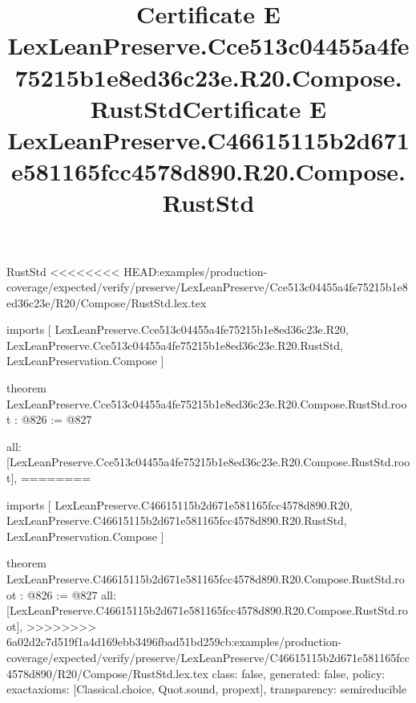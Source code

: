 \begin{lexlean}{RustStd}
<<<<<<<< HEAD:examples/production-coverage/expected/verify/preserve/LexLeanPreserve/Cce513c04455a4fe75215b1e8ed36c23e/R20/Compose/RustStd.lex.tex
\title{Certificate E LexLeanPreserve.Cce513c04455a4fe75215b1e8ed36c23e.R20.Compose.RustStd}
\begin{coremodule}
imports [
  LexLeanPreserve.Cce513c04455a4fe75215b1e8ed36c23e.R20,
  LexLeanPreserve.Cce513c04455a4fe75215b1e8ed36c23e.R20.RustStd,
  LexLeanPreservation.Compose
]

theorem LexLeanPreserve.Cce513c04455a4fe75215b1e8ed36c23e.R20.Compose.RustStd.root : @826 := @827 {
  all: [LexLeanPreserve.Cce513c04455a4fe75215b1e8ed36c23e.R20.Compose.RustStd.root],
========
\title{Certificate E LexLeanPreserve.C46615115b2d671e581165fcc4578d890.R20.Compose.RustStd}
\begin{coremodule}
imports [
  LexLeanPreserve.C46615115b2d671e581165fcc4578d890.R20,
  LexLeanPreserve.C46615115b2d671e581165fcc4578d890.R20.RustStd,
  LexLeanPreservation.Compose
]

theorem LexLeanPreserve.C46615115b2d671e581165fcc4578d890.R20.Compose.RustStd.root : @826 := @827 {
  all: [LexLeanPreserve.C46615115b2d671e581165fcc4578d890.R20.Compose.RustStd.root],
>>>>>>>> 6a02d2c7d519f1a4d169ebb3496fbad51bd259cb:examples/production-coverage/expected/verify/preserve/LexLeanPreserve/C46615115b2d671e581165fcc4578d890/R20/Compose/RustStd.lex.tex
  class: false,
  generated: false,
  policy: exact{axioms: [Classical.choice, Quot.sound, propext]},
  transparency: semireducible
}


\end{coremodule}}
\end{coremodule}
\end{lexlean}

